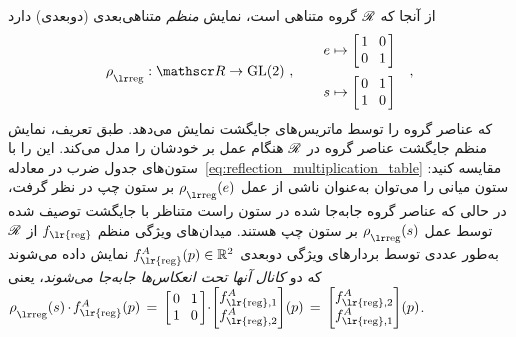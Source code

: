 از آنجا که $\mathscr{R}$ گروه متناهی است، نمایش \emph{منظم} متناهی‌بعدی (دوبعدی) دارد
\begin{align}
	\rhoreg: \Flip \to \GL{2}\ , \qquad 
	\begin{aligned}
		e &\mapsto
		\begin{bmatrix} \hspace{1.5pt}
			1 &\mkern-4mu 0 \hspace*{1.5pt} \\ \hspace{1.5pt} 0 &\mkern-4mu 1 \hspace*{1.5pt}
		\end{bmatrix} \\[2pt]
		s &\mapsto 
		\begin{bmatrix} \hspace{1.5pt}
			0 &\mkern-4mu 1 \hspace*{1.5pt} \\ \hspace{1.5pt} 1 &\mkern-4mu 0 \hspace*{1.5pt}
		\end{bmatrix}
	\end{aligned}
	\quad ,
\end{align}
که عناصر گروه را توسط ماتریس‌های جایگشت نمایش می‌دهد.
طبق تعریف، نمایش منظم جایگشت عناصر گروه در $\mathscr{R}$ هنگام عمل بر خودشان را مدل می‌کند.
این را با ستون‌های جدول ضرب در معادله~\eqref{eq:reflection_multiplication_table} مقایسه کنید:
ستون میانی را می‌توان به‌عنوان ناشی از عمل $\rhoreg(e)$ بر ستون چپ در نظر گرفت، در حالی که عناصر گروه جابه‌جا شده در ستون راست متناظر با جایگشت توصیف شده توسط عمل $\rhoreg(s)$ بر ستون چپ هستند.
میدان‌های ویژگی منظم $f_{\textup{\lr{reg}}}$ از $\mathscr{R}$ به‌طور عددی توسط بردارهای ویژگی دوبعدی $f^A_{\textup{\lr{reg}}}(p) \in \R^2$ نمایش داده می‌شوند که دو \emph{کانال آنها تحت انعکاس‌ها جابه‌جا می‌شوند}، یعنی
$
\rhoreg(s) \mkern-1mu\cdot\mkern-2mu f^A_{\textup{\lr{reg}}}(p)
\,=\,
\begin{bmatrix} \hspace{1.5pt} 0 &\mkern-4mu 1 \hspace*{1.5pt} \\ \hspace{1.5pt} 1 &\mkern-4mu 0 \hspace*{1.5pt} \end{bmatrix}
\mkern-4mu \cdot\mkern-4mu 
\begin{bmatrix} f^A_{\textup{\lr{reg}},1} \\ f^A_{\textup{\lr{reg}},2} \end{bmatrix} \!(p)
\,=\,
\begin{bmatrix} f^A_{\textup{\lr{reg}},2} \\ f^A_{\textup{\lr{reg}},1} \end{bmatrix} \!(p)
$.

